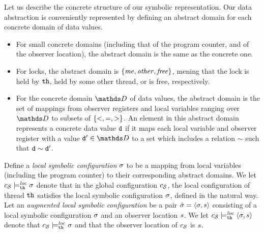 Let us describe the concrete structure of our symbolic representation.
Our data abstraction is conveniently represented by defining an
abstract domain for each concrete domain of data values.
\begin{itemize}
\item For small concrete domains (including that of the program counter, and
  of the observer location),
  the abstract domain is the same as the concrete one.
\item
  For locks, the abstract domain is $\left\{\mathit{me},\mathit{other},\mathit{free}\right\}$,
  mening that the lock is held by ${\tt th}$,  held by some other thread, or is
  free, respectively.
\item For the concrete domain $\ddomain$ of data values, the abstract domain
  is the set of mappings from observer registers and local variables
  ranging over $\ddomain$ to subsets of $\left\{<,=,>\right\}$.
  An element in this abstract domain represents a concrete data value $\tt d$
  if it maps each local variable and observer register with a value ${\tt d'} \in \ddomain$
  to a set which includes a relation $\sim$ such that $\tt d \sim \tt d'$.
\end{itemize}
Define a {\em local symbolic configuration} $\sigma$ to be
a mapping from local
variables (including the program counter) to their corresponding abstract
domains.
We let $c_{\mathcal S} \models_{{\tt th}}^{\mathit{loc}} \sigma$ denote that in the
global configuration $c_{\mathcal S}$, the
local configuration of thread ${\tt th}$ satisfies the local symbolic
configuration $\sigma$, defined in the natural way. Let an {\em augmented
local symbolic configuration} be a pair
$\hat{\sigma} = \left\langle\sigma,s\right\rangle$ consisting of
a local symbolic configuration $\sigma$ and an observer location $s$.
We let $c_{\mathcal S} \models_{{\tt th}}^{\mathit{loc}} \left\langle\sigma,s\right\rangle$ denote
that $c_{\mathcal S} \models_{{\tt th}}^{\mathit{loc}} \sigma$
and that the observer location of $c_{\mathcal S}$ is $s$.

